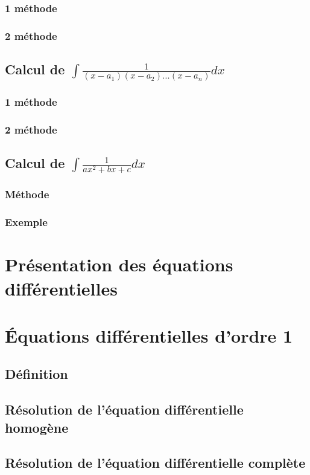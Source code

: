\documentclass[12pt,a4paper,french]{book}
\begin{document}
			\subsubsection{1 méthode}
			\subsubsection{2 méthode}
		\subsection{Calcul de $\int \frac{1}{(x-a_1)(x-a_2)\dots(x-a_n)}dx$}
			\subsubsection{1 méthode}
			\subsubsection{2 méthode}
		\subsection{Calcul de $\int \frac{1}{ax^{2}+bx+c}dx$}
			\subsubsection{Méthode}
			\subsubsection{Exemple}
	\section{Présentation des équations différentielles}
	\section{Équations différentielles d'ordre 1}
		\subsection{Définition}
		\subsection{Résolution de l'équation différentielle homogène}
		\subsection{Résolution de l'équation différentielle complète}
\end{document}
